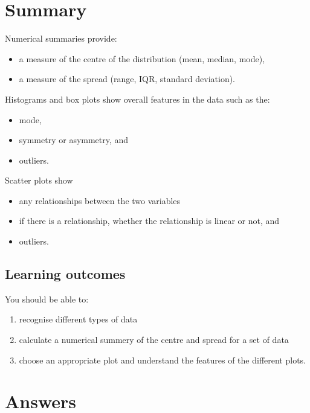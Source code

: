 \documentclass[
  oneside]{krantz}
\begin{document}
\hypertarget{SUMdata}{%
\section{Summary}\label{SUMdata}}

Numerical summaries provide:

\begin{itemize}
\item
  a measure of the centre of the distribution (mean, median, mode),
\item
  a measure of the spread (range, IQR, standard deviation).
\end{itemize}

Histograms and box plots show overall features in the data such as the:

\begin{itemize}
\item
  mode,
\item
  symmetry or asymmetry, and
\item
  outliers.
\end{itemize}

Scatter plots show

\begin{itemize}
\item
  any relationships between the two variables
\item
  if there is a relationship, whether the relationship is linear or not, and
\item
  outliers.
\end{itemize}

\hypertarget{learning-outcomes}{%
\subsection{Learning outcomes}\label{learning-outcomes}}

You should be able to:

\begin{enumerate}
\def\labelenumi{\arabic{enumi}.}
\item
  recognise different types of data
\item
  calculate a numerical summery of the centre and spread for a set of data
\item
  choose an appropriate plot and understand the features of the different plots.
\end{enumerate}

\hypertarget{ANSdata}{%
\section{Answers}\label{ANSdata}}
\end{document}
